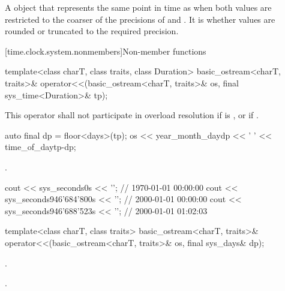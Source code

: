 \begin{itemdescr}
\pnum
\returns A  object that represents the same point in time as 
when both values are restricted to the coarser of the precisions of  and
.
It is 
whether values are rounded or truncated to the required precision.
\end{itemdescr}

[time.clock.system.nonmembers]{Non-member functions}

%
\begin{itemdecl}
template<class charT, class traits, class Duration>
  basic_ostream<charT, traits>&
    operator<<(basic_ostream<charT, traits>& os, final sys_time<Duration>& tp);
\end{itemdecl}

\begin{itemdescr}
\pnum
\remarks
This operator shall not participate in overload resolution if
 is ,
or if .

\pnum
\effects
\begin{codeblock}
auto final dp = floor<days>(tp);
os << year_month_day{dp} << ' ' << time_of_day{tp-dp};
\end{codeblock}

\pnum
\returns {}.

\pnum
\begin{example}
\begin{codeblock}
cout << sys_seconds{0s} << '\n';                // 1970-01-01 00:00:00
cout << sys_seconds{946'684'800s} << '\n';      // 2000-01-01 00:00:00
cout << sys_seconds{946'688'523s} << '\n';      // 2000-01-01 01:02:03
\end{codeblock}
\end{example}
\end{itemdescr}

%
\begin{itemdecl}
template<class charT, class traits>
  basic_ostream<charT, traits>&
    operator<<(basic_ostream<charT, traits>& os, final sys_days& dp);
\end{itemdecl}

\begin{itemdescr}
\pnum
\effects {}.

\pnum
\returns {}.
\end{itemdescr}

